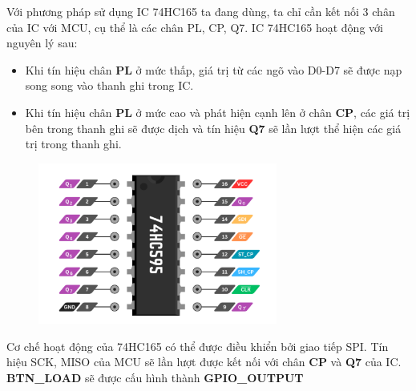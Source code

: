 Với phương pháp sử dụng IC 74HC165 ta đang dùng, ta chỉ cần kết nối 3 chân của IC với MCU, cụ thể là các chân PL, CP, Q7. IC 74HC165 hoạt động với nguyên lý sau:
\begin{itemize}
    \item Khi tín hiệu chân \textbf{PL} ở mức thấp, giá trị từ các ngõ vào D0-D7 sẽ được nạp song song vào thanh ghi trong IC.
    \item Khi tín hiệu chân \textbf{PL} ở mức cao và phát hiện cạnh lên ở chân \textbf{CP}, các giá trị bên trong thanh ghi sẽ được dịch và tín hiệu \textbf{Q7} sẽ lần lượt thể hiện các giá trị trong thanh ghi.
\end{itemize}
\begin{figure}[!htbp]
    \centering
    \includegraphics[width=0.7\textwidth]{graphics/ic_74HC165.PNG}
\end{figure}

Cơ chế hoạt động của 74HC165 có thể được điều khiển bởi giao tiếp SPI. Tín hiệu SCK, MISO của MCU sẽ lần lượt được kết nối với chân \textbf{CP} và \textbf{Q7} của IC. \textbf{BTN\_LOAD} sẽ được cấu hình thành \textbf{GPIO\_OUTPUT}